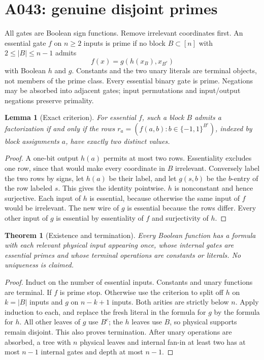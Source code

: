 \documentclass{article}
\newtheorem{theorem}{Theorem}
\newtheorem{lemma}{Lemma}
\begin{document}
\section*{A043: genuine disjoint primes}
All gates are Boolean sign functions. Remove irrelevant coordinates first.
An essential gate $f$ on $n\ge2$ inputs is prime if no block
$B\subset[n]$ with $2\le |B|\le n-1$ admits
\[
 f(x)=g(h(x_B),x_{B^c})
\]
with Boolean $h$ and $g$. Constants and the two unary literals are
terminal objects, not members of the prime class. Every essential binary
gate is prime. Negations may be absorbed into adjacent gates; input
permutations and input/output negations preserve primality.

\begin{lemma}[Exact criterion]
For essential $f$, such a block $B$ admits a factorization if and only if
the rows $r_a=(f(a,b):b\in\{-1,1\}^{B^c})$, indexed by block assignments
$a$, have exactly two distinct values.
\end{lemma}
\begin{proof}
A one-bit output $h(a)$ permits at most two rows. Essentiality excludes
one row, since that would make every coordinate in $B$ irrelevant.
Conversely label the two rows by signs, let $h(a)$ be their label, and
let $g(s,b)$ be the $b$-entry of the row labeled $s$. This gives the
identity pointwise. $h$ is nonconstant and hence surjective. Each input
of $h$ is essential, because otherwise the same input of $f$ would be
irrelevant. The new wire of $g$ is essential because the rows differ.
Every other input of $g$ is essential by essentiality of $f$ and
surjectivity of $h$.
\end{proof}

\begin{theorem}[Existence and termination]
Every Boolean function has a formula with each relevant physical input
appearing once, whose internal gates are essential primes and whose
terminal operations are constants or literals. No uniqueness is claimed.
\end{theorem}
\begin{proof}
Induct on the number of essential inputs. Constants and unary functions
are terminal. If $f$ is prime stop. Otherwise use the criterion to split
off $h$ on $k=|B|$ inputs and $g$ on $n-k+1$ inputs. Both arities are
strictly below $n$. Apply induction to each, and replace the fresh
literal in the formula for $g$ by the formula for $h$. All other leaves
of $g$ use $B^c$; the $h$ leaves use $B$, so physical supports remain
disjoint. This also proves termination. After unary operations are
absorbed, a tree with $n$ physical leaves and internal fan-in at least
two has at most $n-1$ internal gates and depth at most $n-1$.
\end{proof}
\end{document}
